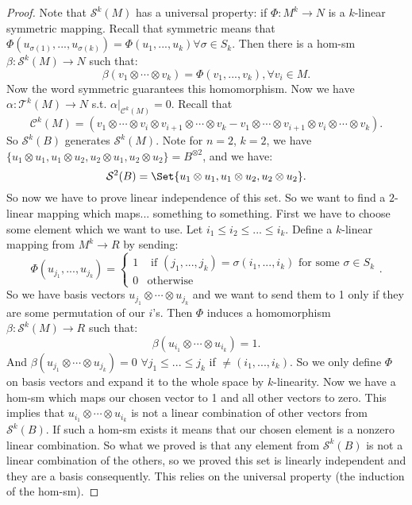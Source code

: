 \documentclass[9pt,reqno,twoside]{amsbook}
\theoremstyle{plain}
\numberwithin{section}{chapter}
\numberwithin{equation}{chapter}
\theoremstyle{definition}
\theoremstyle{remark}
\theoremstyle{plain}
\newcommand{\mc}{\mathcal}
\newcommand{\tens}{\otimes}
\newcommand{\lpar}{\left(}
\newcommand{\rpar}{\right)}
\renewcommand{\leq}{\leqslant}
\begin{document}
\begin{proof}
Note that $\mc{S}^k(M)$ has a universal property: if $\Phi:M^k \to N$ is a $k$-linear symmetric mapping. Recall that symmetric means that $\Phi(u_{\sigma(1)},...,u_{\sigma(k)}) = \Phi(u_1,...,u_k) \forall \sigma \in S_k$. Then  there is a hom-sm $\beta:\mc{S}^k(M) \to N$ such that: 
 $$
 \beta(v_1 \tens \cdots \tens v_k) = \Phi(v_1,...,v_k), \forall v_i \in M.
 $$
 Now the word symmetric guarantees this homomorphism. Now we have $\alpha:\mc{T}^k(M) \to N$ s.t. $\alpha|_{\mc{C}^k(M)} = 0$. Recall that 
 $$
 \mc{C}^k(M) = \lpar v_1 \tens \cdots \tens v_i \tens v_{i + 1} \tens \cdots \tens v_k - v_1 \tens \cdots \tens v_{i + 1} \tens v_i \tens \cdots \tens v_k \rpar. 
 $$
So $\mc{S}^k(B)$ generates $\mc{S}^k(M)$. Note for $n = 2$, $k = 2$, we have $\{u_1 \tens u_1,u_1 \tens u_2,u_2 \tens u_1,u_2 \tens u_2\} = B^{\tens 2}$, and we have:
$$
\mc{S}^2(B) = \Set{u_1 \tens u_1,u_1 \tens u_2,u_2 \tens u_2}.
$$
So now we have to prove linear independence of this set. So we want to find a $2$-linear mapping which maps... something to something. First we have to choose  some element which we want to use. Let $i_1 \leq i_2 \leq ... \leq i_k$. Define a $k$-linear mapping from $M^k \to R$ by sending: 
$$
\Phi(u_{j_1},...,u_{j_k}) = \begin{cases}
1 & \text{ if }(j_1,...,j_k) = \sigma(i_1,...,i_k) \text{ for some }\sigma \in S_k\\
0 & \text{otherwise}
\end{cases}.
$$
So we have basis vectors $u_{j_1}\tens \cdots \tens u_{j_k}$ and we want to send them to 1 only if they are some permutation of our $i$'s. Then $\Phi$ induces a homomorphism $\beta:\mc{S}^k(M) \to R$ such that:
$$
\beta(u_{i_1} \tens \cdots \tens u_{i_k}) = 1.
$$
And $\beta(u_{j_1}  \tens \cdots \tens u_{j_k}) = 0$ $\forall j_1 \leq ...\leq j_k$ if $\neq (i_1,...,i_k)$. So we only define $\Phi$ on basis vectors and expand it to the whole space by $k$-linearity. Now we have a hom-sm which maps our chosen vector to 1 and all other vectors to zero. This implies that $u_{i_1}  \tens \cdots \tens u_{i_k}$ is not a linear combination of other vectors from $\mc{S}^k(B)$. If such a hom-sm exists it means that our chosen element is a nonzero linear combination. So what we proved is that any element from $\mc{S}^k(B)$ is not a linear combination of the others, so we proved this set is linearly independent and they are a basis consequently. This relies on the universal property (the induction of the hom-sm). 
\end{proof}
\end{document}
